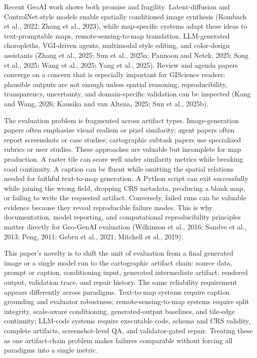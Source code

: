 \documentclass[]{interact}
\begin{document}
Recent GeoAI work shows both promise and fragility. Latent-diffusion and ControlNet-style models enable spatially conditioned image synthesis (Rombach et al., 2022; Zhang et al., 2023), while map-specific systems adapt these ideas to text-promptable maps, remote-sensing-to-map translation, LLM-generated choropleths, VGI-driven agents, multimodal style editing, and color-design assistants (Zhang et al., 2025; Sun et al., 2025a; Pannoon and Netek, 2025; Song et al., 2025; Wang et al., 2025; Yang et al., 2025). Review and agenda papers converge on a concern that is especially important for GIScience readers: plausible outputs are not enough unless spatial reasoning, reproducibility, transparency, uncertainty, and domain-specific validation can be inspected (Kang and Wang, 2026; Kausika and van Altena, 2025; Sun et al., 2025b).

The evaluation problem is fragmented across artifact types. Image-generation papers often emphasize visual realism or pixel similarity; agent papers often report screenshots or case studies; cartographic subtask papers use specialized rubrics or user studies. These approaches are valuable but incomplete for map production. A raster tile can score well under similarity metrics while breaking road continuity. A caption can be fluent while omitting the spatial relations needed for faithful text-to-map generation. A Python script can exit successfully while joining the wrong field, dropping CRS metadata, producing a blank map, or failing to write the requested artifact. Conversely, failed runs can be valuable evidence because they reveal reproducible failure modes. This is why documentation, model reporting, and computational reproducibility principles matter directly for Geo-GenAI evaluation (Wilkinson et al., 2016; Sandve et al., 2013; Peng, 2011; Gebru et al., 2021; Mitchell et al., 2019).

This paper's novelty is to shift the unit of evaluation from a final generated image or a single model run to the cartographic artifact chain: source data, prompt or caption, conditioning input, generated intermediate artifact, rendered output, validation trace, and repair history. The same reliability requirement appears differently across paradigms. Text-to-map systems require caption grounding and evaluator robustness; remote-sensing-to-map systems require split integrity, scale-aware conditioning, generated-output baselines, and tile-edge continuity; LLM-code systems require executable code, schema and CRS validity, complete artifacts, screenshot-level QA, and validator-gated repair. Treating these as one artifact-chain problem makes failures comparable without forcing all paradigms into a single metric.
\end{document}
